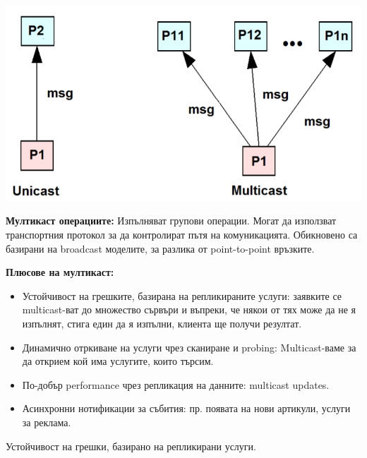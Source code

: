 \documentclass[11pt]{article} %
\begin{document}
\begin{center}
	\includegraphics[scale=0.5]{UniMulticast.png}
\end{center} 
 
\textbf{Мултикаст операциите: } Изпълняват групови операции. Могат да използват транспортния протокол за да контролират пътя на комуникацията. Обикновено са базирани на broadcast моделите, за разлика от point-to-point връзките.\\\par
\textbf{Плюсове на мултикаст: } 
\begin{itemize}[noitemsep]
	\item Устойчивост на грешките, базирана на репликираните услуги: заявките се multicast-ват до множество сървъри и въпреки, че някои от тях може да не я изпълнят, стига един да я изпълни, клиента ще получи резултат.
	\item Динамично отркиване на услуги чрез сканиране и probing: Multicast-ваме за да открием кой има услугите, които търсим.
	\item По-добър performance чрез репликация на данните: multicast updates.
	\item Асинхронни нотификации за събития: пр. появата на нови артикули, услуги за реклама.
\end{itemize}
Устойчивост на грешки, базирано на репликирани услуги.\\\par 
\end{document}

